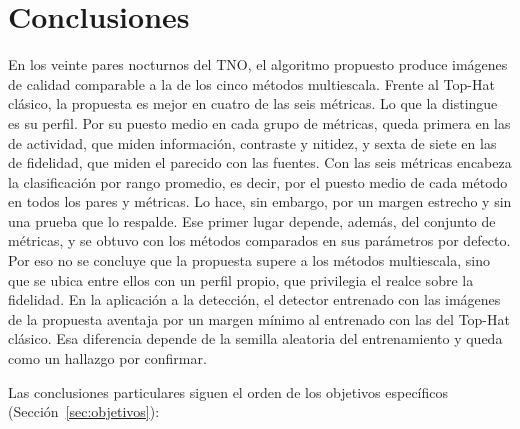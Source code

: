 \chapter{Conclusiones}
\label{cap:conclusiones}

En los veinte pares nocturnos del TNO, el algoritmo propuesto produce imágenes de calidad comparable a
la de los cinco métodos multiescala. Frente al Top-Hat clásico, la propuesta es mejor en cuatro de las
seis métricas. Lo que la distingue es su perfil. Por su puesto medio en cada grupo de métricas, queda primera en las de actividad, que miden
información, contraste y nitidez, y sexta de siete en las de fidelidad, que miden el parecido con las
fuentes. Con las seis métricas encabeza la clasificación por rango promedio, es decir, por el puesto
medio de cada método en todos los pares y métricas. Lo hace, sin embargo, por un margen estrecho y sin
una prueba que lo respalde. Ese primer lugar depende, además, del conjunto de métricas, y se obtuvo con
los métodos comparados en sus parámetros por defecto. Por eso no se concluye que la propuesta supere a los métodos multiescala,
sino que se ubica entre ellos con un perfil propio, que privilegia el realce sobre la fidelidad. En la
aplicación a la detección, el detector entrenado con las imágenes de la propuesta aventaja por un margen
mínimo al entrenado con las del Top-Hat clásico. Esa diferencia depende de la semilla aleatoria del
entrenamiento y queda como un hallazgo por confirmar.

Las conclusiones particulares siguen el orden de los objetivos específicos
(Sección~\ref{sec:objetivos}):

